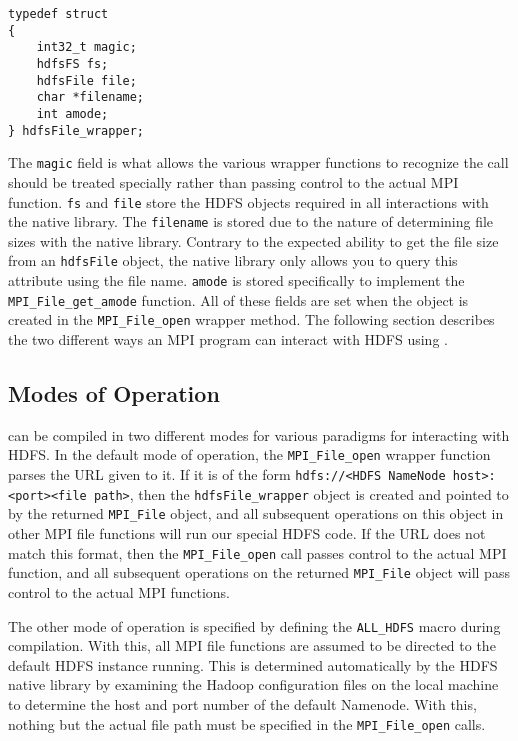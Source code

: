 \begin{lstlisting}
typedef struct
{
	int32_t magic;
	hdfsFS fs;
	hdfsFile file;
	char *filename;
	int amode;
} hdfsFile_wrapper;
\end{lstlisting}

The \texttt{magic} field is what allows the various wrapper functions to
recognize the call should be treated specially rather than passing control to
the actual MPI function. \texttt{fs} and \texttt{file} store the HDFS objects
required in all interactions with the native library. The \texttt{filename} is
stored due to the nature of determining file sizes with the native library.
Contrary to the expected ability to get the file size from an \texttt{hdfsFile}
object, the native library only allows you to query this attribute using the
file name. \texttt{amode} is stored specifically to implement the
\texttt{MPI\_File\_get\_amode} function. All of these fields are set when the
object is created in the \texttt{MPI\_File\_open} wrapper method. The following
section describes the two different ways an MPI program can interact with HDFS using {\proj}.

\subsection{Modes of Operation}
{\proj} can be compiled in two different modes for various paradigms for
interacting with HDFS. In the default mode of operation, the
\texttt{MPI\_File\_open} wrapper function parses the URL given to it. If it is
of the form \texttt{hdfs://<HDFS NameNode host>:<port><file path>}, then the
\texttt{hdfsFile\_wrapper} object is created and pointed to by the returned
\texttt{MPI\_File} object, and all subsequent operations on this object in other
MPI file functions will run our special HDFS code. If the URL does not match
this format, then the \texttt{MPI\_File\_open} call passes control to the actual
MPI function, and all subsequent operations on the returned \texttt{MPI\_File}
object will pass control to the actual MPI functions. 

The other mode of operation is specified by defining the \texttt{ALL\_HDFS} macro during compilation.
With this, all MPI file functions are assumed to be directed to the default HDFS
instance running. This is determined automatically by the HDFS native library by
examining the Hadoop configuration files on the local machine to determine the
host and port number of the default Namenode. With this, nothing but the actual
file path must be specified in the \texttt{MPI\_File\_open} calls. 

